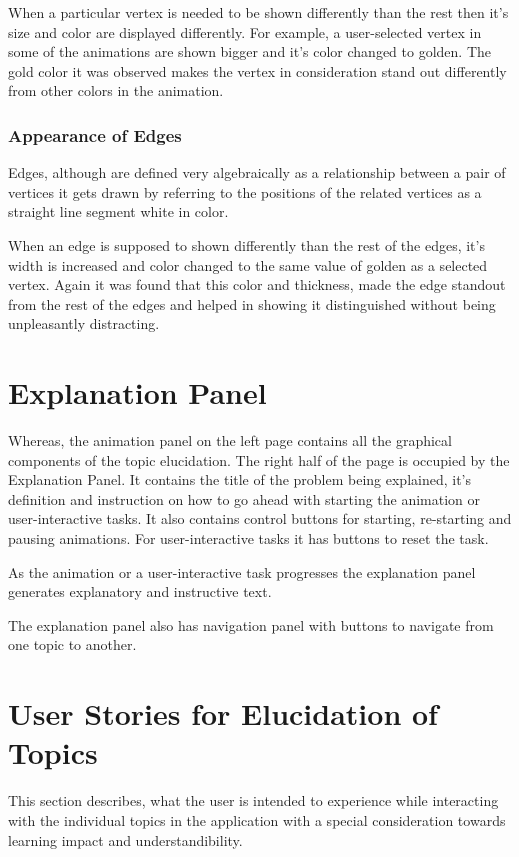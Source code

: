 When a particular vertex is needed to be shown differently than the rest then
it's size and color are displayed differently. For example, a user-selected
vertex in some of the animations are shown bigger and it's color changed to
golden. The gold color it was observed makes the vertex in consideration
stand out differently from other colors in the animation.

\subsubsection{Appearance of Edges}
Edges, although are defined very algebraically as a relationship between a pair
of vertices it gets drawn by referring to the positions of the related vertices
as a straight line segment white in color.

When an edge is supposed to shown differently than the rest of the edges, it's
width is increased and color changed to the same value of golden as a selected vertex.
Again it was found that this color and thickness, made the edge standout from the
rest of the edges and helped in showing it distinguished without being unpleasantly
distracting.

\section{Explanation Panel}
Whereas, the animation panel on the left page contains all the graphical
components of the topic elucidation.  The right half of the page is occupied by
the Explanation Panel. It contains the title of the problem being explained,
it's definition and instruction on how to go ahead with starting the animation
or user-interactive tasks.  It also contains control buttons for starting,
re-starting and pausing animations.  For user-interactive tasks it has buttons
to reset the task.

As the animation or a user-interactive task progresses the explanation panel
generates explanatory and instructive text.

The explanation panel also has navigation panel with buttons to navigate from
one topic to another.

\section{User Stories for Elucidation of Topics}

This section describes, what the user is intended to experience while
interacting with the individual topics in the application with a special
consideration towards learning impact and understandibility.

